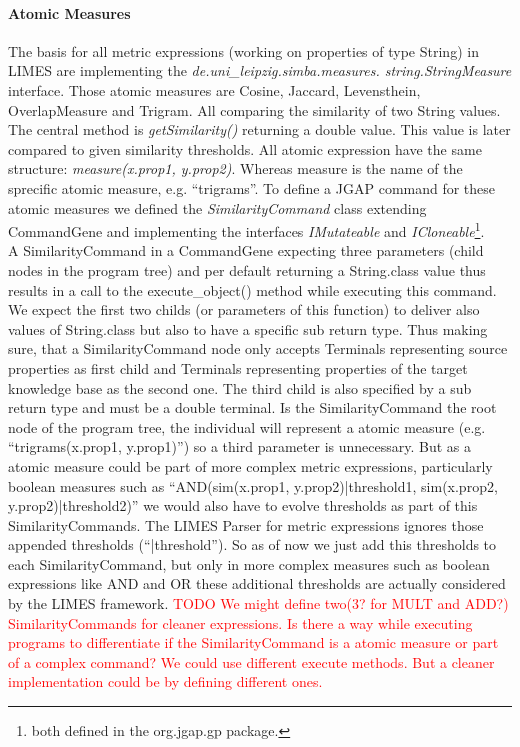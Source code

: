 \documentclass{article}%
\begin{document}
\paragraph{Atomic Measures}
\label{sec:AtomicMeasures}
The basis for all metric expressions (working on properties of type String) in LIMES are implementing the \textit{de.uni\_leipzig.simba.measures. string.StringMeasure} interface. Those atomic measures are Cosine, Jaccard, Levensthein, OverlapMeasure and Trigram. All comparing the similarity of two String values. The central method is \textit{getSimilarity()} returning a double value. This value is later compared to given similarity thresholds. All atomic expression have the same structure: \textit{measure(x.prop1, y.prop2)}. Whereas measure is the name of the sprecific atomic measure, e.g. ``trigrams''. To define a JGAP command for these atomic measures we defined the \textit{SimilarityCommand} class extending CommandGene and implementing the interfaces \textit{IMutateable} and \textit{ICloneable}\footnote{both defined in the org.jgap.gp package.}.\\
A SimilarityCommand in a CommandGene expecting three parameters (child nodes in the program tree) and per default returning a String.class value thus results in a call to the execute\_object() method while executing this command. We expect the first two childs (or parameters of this function) to deliver also values of String.class but also to have a specific sub return type. Thus making sure, that a SimilarityCommand node only accepts Terminals representing source properties as first child and Terminals representing properties of the target knowledge base as the second one. The third child is also specified by a sub return type and must be a double terminal. Is the SimilarityCommand the root node of the program tree, the individual will represent a atomic measure (e.g. ``trigrams(x.prop1, y.prop1)'') so a third parameter is unnecessary. But as a atomic measure could be part of more complex metric expressions, particularly boolean measures such as ``AND(sim(x.prop1, y.prop2)|threshold1, sim(x.prop2, y.prop2)|threshold2)'' we would also have to evolve thresholds as part of this SimilarityCommands. The LIMES Parser for metric expressions ignores those appended thresholds (``|threshold''). So as of now we just add this thresholds to each SimilarityCommand, but only in more complex measures such as boolean expressions like AND and OR these additional thresholds are actually considered by the LIMES framework.
\textcolor{red}{TODO We might define two(3? for MULT and ADD?) SimilarityCommands for cleaner expressions. Is there a way while executing programs to differentiate if the SimilarityCommand is a atomic measure or part of a complex command? We could use different execute methods. But a cleaner implementation could be by defining different ones. }
\end{document}
